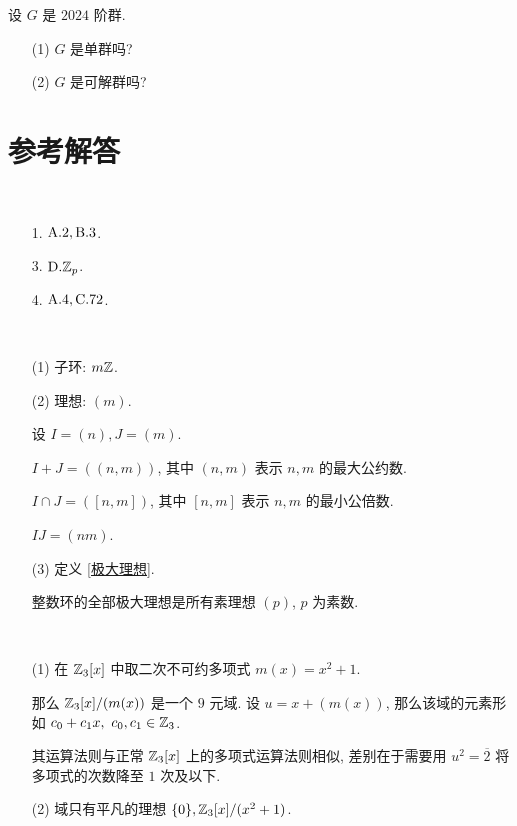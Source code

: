 \problem[题目 8] 设 $G$ 是 $2024$ 阶群.

\begin{itemize}
	\item[(1)] $G$ 是单群吗?
	\item[(2)] $G$ 是可解群吗?
\end{itemize}

\section*{参考解答}

\problem[题目 1]

\begin{solution}\
	\begin{itemize}
		\item[1.] $\text {A}.2,\text {B}.3$.
		\item[3.] $\text {D}.\mathbb Z_p$.
		\item[4.] $\text {A}.4,\text {C}.72$.
	\end{itemize}
\end{solution}

\problem[题目 2]

\begin{solution}\
	\begin{itemize}
		\item[(1)] 子环: $m\mathbb Z$.
		\item[(2)] 理想: $(m)$.

		设 $I=(n),J=(m)$.

		$I+J=((n,m))$, 其中 $(n,m)$ 表示 $n,m$ 的最大公约数.

		$I\cap J=([n,m])$, 其中 $[n,m]$ 表示 $n,m$ 的最小公倍数.

		$IJ=(nm)$.

		\item[(3)]定义 \ref{极大理想}.

		整数环的全部极大理想是所有素理想 $(p)$, $p$ 为素数.
	\end{itemize}
\end{solution}

\problem[题目 3]

\begin{solution}\
	\begin{itemize}
		\item[(1)] 在 $\mathbb Z_3[x]$ 中取二次不可约多项式 $m(x)=x^2+1$.

		那么 $\mathbb Z_3[x]/(m(x))$ 是一个 $9$ 元域. 设 $u=x+(m(x))$, 那么该域的元素形如 $c_0+c_1x,\ c_0,c_1\in\Z_3$.

		其运算法则与正常 $\mathbb Z_3[x]$ 上的多项式运算法则相似, 差别在于需要用 $u^2=\overline{2}$ 将多项式的次数降至 $1$ 次及以下.

		\item[(2)] 域只有平凡的理想 $\{0\},\mathbb Z_3[x]/(x^2+1)$.
	\end{itemize}
\end{solution}


